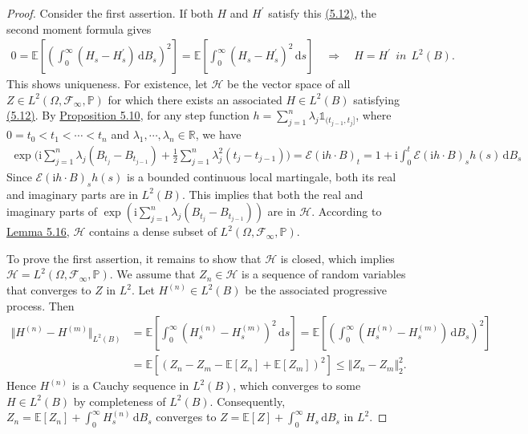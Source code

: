 \documentclass{article}
\numberwithin{equation}{section}
\newcommand{\E}{\mathbb{E}}
\renewcommand{\P}{\mathbb{P}}
\renewcommand{\d}{\mathrm{d}}
\renewcommand{\i}{\mathrm{i}}
\theoremstyle{plain}
\theoremstyle{definition}
\begin{document}
\begin{proof}
Consider the first assertion. If both $H$ and $H^\prime$ satisfy this \hyperref[eq:5.12]{(5.12)}, the second moment formula gives
\begin{align*}
	0=\E\left[\left(\int_0^\infty(H_s-H^\prime_s)\,\d B_s\right)^2\right]=\E\left[\int_0^\infty(H_s-H^\prime_s)^2\,\d s\right]\quad\Rightarrow\quad H=H^\prime\ \ \textit{in}\ \ L^2(B).
\end{align*}
This shows uniqueness. For existence, let $\mathscr{H}$ be the vector space of all $Z\in L^2(\Omega,\mathscr{F}_\infty,\P)$ for which there exists an associated $H\in L^2(B)$ satisfying \hyperref[eq:5.12]{(5.12)}. By \hyperref[prop:5.10]{Proposition 5.10}, for any step function $h=\sum_{j=1}^n\lambda_j\mathds{1}_{(t_{j-1},t_j]}$, where $0=t_0<t_1<\cdots<t_n$ and $\lambda_1,\cdots,\lambda_n\in\mathbb{R}$, we have
\begin{align*}
	\exp\biggl(\i\sum_{j=1}^n\lambda_j(B_{t_j}-B_{t_{j-1}})+\frac{1}{2}\sum_{j=1}^n\lambda_j^2(t_j-t_{j-1})\biggr)=\mathscr{E}(\i h\cdot B)_t = 1+\i\int_0^t\mathscr{E}(\i h\cdot B)_s h(s)\,\d B_s
\end{align*}
Since $\mathscr{E}(\i h\cdot B)_sh(s)$ is a bounded continuous local martingale, both its real and imaginary parts are in $L^2(B)$. This implies that both the real and imaginary parts of $\exp\left(\i\sum_{j=1}^n\lambda_j(B_{t_j}-B_{t_{j-1}})\right)$ are in $\mathscr{H}$. According to \hyperref[lemma:5.16]{Lemma 5.16}, $\mathscr{H}$ contains a dense subset of $L^2(\Omega,\mathscr{F}_\infty,\P)$.

To prove the first assertion, it remains to show that $\mathscr{H}$ is closed, which implies $\mathscr{H}=L^2(\Omega,\mathscr{F}_\infty,\P)$. We assume that $Z_n\in\mathscr{H}$ is a sequence of random variables that converges to $Z$ in $L^2$. Let $H^{(n)}\in L^2(B)$ be the associated  progressive process. Then
\begin{align*}
	\Vert H^{(n)}-H^{(m)}\Vert_{L^2(B)} &= \E\left[\int_0^\infty(H^{(n)}_s-H^{(m)}_s)^2\,\d s\right] = \E\left[\left(\int_0^\infty(H_s^{(n)}-H_s^{(m)})\,\d B_s\right)^2\right]\\
	&= \E\left[\left(Z_n-Z_m-\E[Z_n]+\E[Z_m]\right)^2\right] \leq \Vert Z_n-Z_m\Vert^2_2.
\end{align*}
Hence $H^{(n)}$ is a Cauchy sequence in $L^2(B)$, which converges to some $H\in L^2(B)$ by completeness of $L^2(B)$. Consequently, $Z_n=\E[Z_n]+\int_0^\infty H_s^{(n)}\,\d B_s$ converges to $Z=\E[Z]+\int_0^\infty H_s\,\d B_s$ in $L^2$.


\end{proof}
\end{document}
